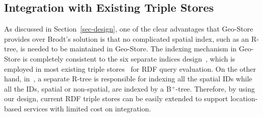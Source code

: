







\subsection{Integration with Existing Triple Stores}

As discussed in Section~\ref{sec-design}, one of the clear advantages that Geo-Store provides over Brodt's solution is that no complicated spatial index, such as an R-tree, is needed to be maintained in Geo-Store. The indexing mechanism in Geo-Store is completely consistent to the six separate indices design~\cite{journals/pvldb/WeissKB08}, which is employed in most existing triple stores~\cite{conf/www/CarrollDDRSW04,conf/vldb/AbadiMMH07,journals/pvldb/WeissKB08,journals/vldb/NeumannW10} for RDF query evaluation. On the other hand, in~\cite{conf/gis/BrodtNM10}, a separate R-tree is responsible for indexing all the spatial IDs while all the IDs, spatial or non-spatial, are indexed by a B$^{+}$-tree. Therefore, by using our design, current RDF triple stores can be easily extended to support location-based services with limited cost on integration.